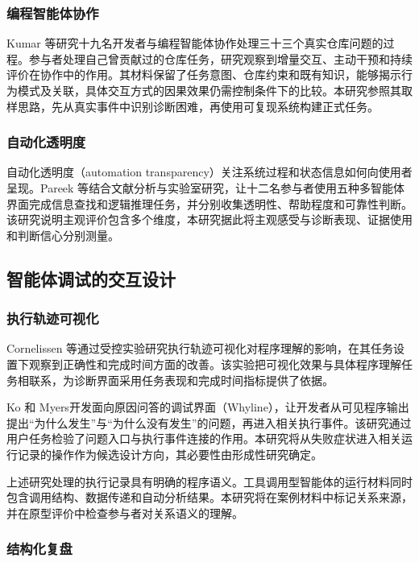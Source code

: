 \subsubsection{编程智能体协作}

Kumar 等\cite{ref59}研究十九名开发者与编程智能体协作处理三十三个真实仓库问题的过程。参与者处理自己曾贡献过的仓库任务，研究观察到增量交互、主动干预和持续评价在协作中的作用。其材料保留了任务意图、仓库约束和既有知识，能够揭示行为模式及关联，具体交互方式的因果效果仍需控制条件下的比较。本研究参照其取样思路，先从真实事件中识别诊断困难，再使用可复现系统构建正式任务。

\subsubsection{自动化透明度}

自动化透明度（automation transparency）关注系统过程和状态信息如何向使用者呈现。Pareek 等\cite{ref58}结合文献分析与实验室研究，让十二名参与者使用五种多智能体界面完成信息查找和逻辑推理任务，并分别收集透明性、帮助程度和可靠性判断。该研究说明主观评价包含多个维度，本研究据此将主观感受与诊断表现、证据使用和判断信心分别测量。

\subsection{智能体调试的交互设计}

\subsubsection{执行轨迹可视化}

Cornelissen 等\cite{ref33}通过受控实验研究执行轨迹可视化对程序理解的影响，在其任务设置下观察到正确性和完成时间方面的改善。该实验把可视化效果与具体程序理解任务相联系，为诊断界面采用任务表现和完成时间指标提供了依据。

Ko 和 Myers\cite{ref07}开发面向原因问答的调试界面（Whyline），让开发者从可见程序输出提出“为什么发生”与“为什么没有发生”的问题，再进入相关执行事件。该研究通过用户任务检验了问题入口与执行事件连接的作用。本研究将从失败症状进入相关运行记录的操作作为候选设计方向，其必要性由形成性研究确定。

上述研究处理的执行记录具有明确的程序语义。工具调用型智能体的运行材料同时包含调用结构、数据传递和自动分析结果。本研究将在案例材料中标记关系来源，并在原型评价中检查参与者对关系语义的理解。

\subsubsection{结构化复盘}

